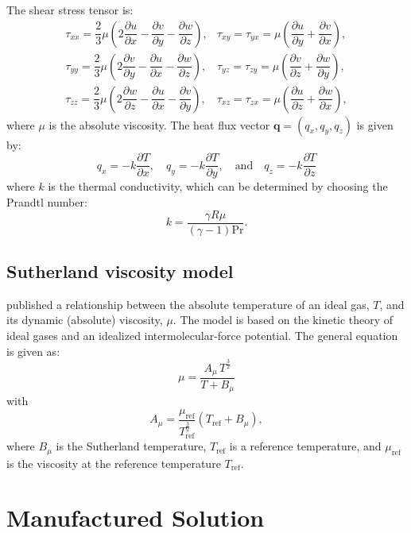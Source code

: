 \documentclass[10pt]{article}
\newcommand{\diff}[2] {\dfrac{\partial #1}{\partial #2}}
\begin{document}
The shear stress tensor is:
\begin{equation}
 \begin{array}{lll}
  \tau_{xx}= \dfrac{2}{3}  \mu \left( 2 \diff{u}{x} - \diff{v}{y} -\diff{w}{z} \right),
  &\tau_{xy}= \tau_{yx}=\mu \left( \diff{u}{y} + \diff{v}{x}\right),\\
  \tau_{yy}= \dfrac{2}{3}  \mu \left( 2 \diff{v}{y} - \diff{u}{x} -\diff{w}{z} \right),
  &\tau_{yz}= \tau_{zy}=\mu \left( \diff{v}{z} + \diff{w}{y}\right),\\
  \tau_{zz}= \dfrac{2}{3}  \mu \left( 2 \diff{w}{z} - \diff{u}{x} -\diff{v}{y} \right),
  &\tau_{xz}= \tau_{zx}=\mu \left( \diff{u}{z} + \diff{w}{x}\right),
 \end{array}
\end{equation}
where $\mu$ is the absolute viscosity. The heat flux vector $\mathbf{q}=(q_x,q_y,q_z)$ is given by:
\begin{equation}
 q_x = - k \diff{T}{x}, \quad q_y = - k \diff{T}{y}, \quad \mbox{and} \quad q_z = - k \diff{T}{z}
 \end{equation}
where $k$ is the thermal conductivity, which can be determined by choosing the Prandtl number:
$$k= \dfrac{\gamma R \mu}{ (\gamma-1) \text{Pr}}.$$



\subsection{Sutherland viscosity model}

\citet{Sutherland1893} published a relationship between the absolute temperature of an ideal gas, $T$,  and its dynamic (absolute) viscosity, $\mu$. The model is based on the kinetic theory of ideal gases and an idealized intermolecular-force potential. The general equation is given as:
\begin{equation}
\label{eq:Sutherland01}
 \mu  =\dfrac{A_\mu \, T^{\frac{3}{2}}}{T+B_\mu}
\end{equation}
with
$$    A_\mu = \dfrac{\mu_\text{ref}}{T_{\text{ref}}^{\frac{3}{2}}}(T_\text{ref} + B_\mu), $$
%
where $B_\mu$ is the Sutherland temperature, $T_{\text{ref}}$ is a reference temperature,  and $\mu_\text{ref}$ is the viscosity at the reference temperature $T_\text{ref}$.

\section{Manufactured Solution}
\end{document}
